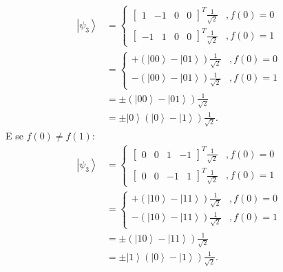 \begin{equation}
\begin{split}
\left|\psi_{3}\right\rangle & =\left\{ \begin{array}{cc}
\left[\begin{array}{cccc}
1 & -1 & 0 & 0\end{array}\right]^{T}\frac{1}{\sqrt{2}} & ,f\left(0\right)=0\\
\left[\begin{array}{cccc}
-1 & 1 & 0 & 0\end{array}\right]^{T}\frac{1}{\sqrt{2}} & ,f\left(0\right)=1
\end{array}\right. \\
& =\left\{ \begin{array}{cc}
+\left(\left|00\right\rangle -\left|01\right\rangle \right)\frac{1}{\sqrt{2}} & ,f\left(0\right)=0\\
-\left(\left|00\right\rangle -\left|01\right\rangle \right)\frac{1}{\sqrt{2}} & ,f\left(0\right)=1
\end{array}\right. \\
& = \pm\left(\left|00\right\rangle -\left|01\right\rangle \right)\frac{1}{\sqrt{2}} \\
& =\pm\left|0\right\rangle \left(\left|0\right\rangle -\left|1\right\rangle \right)\frac{1}{\sqrt{2}}.
\end{split}
\end{equation}
E se $f\left(0\right)\neq f\left(1\right)$:
\begin{equation}
\begin{split}
\left|\psi_{3}\right\rangle & =\left\{ \begin{array}{cc}
\left[\begin{array}{cccc}
0 & 0 & 1 & -1\end{array}\right]^{T}\frac{1}{\sqrt{2}} & ,f\left(0\right)=0\\
\left[\begin{array}{cccc}
0 & 0 & -1 & 1\end{array}\right]^{T}\frac{1}{\sqrt{2}} & ,f\left(0\right)=1
\end{array}\right. \\
& =\left\{ \begin{array}{cc}
+\left(\left|10\right\rangle -\left|11\right\rangle \right)\frac{1}{\sqrt{2}} & ,f\left(0\right)=0\\
-\left(\left|10\right\rangle -\left|11\right\rangle \right)\frac{1}{\sqrt{2}} & ,f\left(0\right)=1
\end{array}\right. \\
& = \pm\left(\left|10\right\rangle -\left|11\right\rangle \right)\frac{1}{\sqrt{2}} \\
& =\pm\left|1\right\rangle \left(\left|0\right\rangle -\left|1\right\rangle \right)\frac{1}{\sqrt{2}}.
\end{split}
\end{equation}
